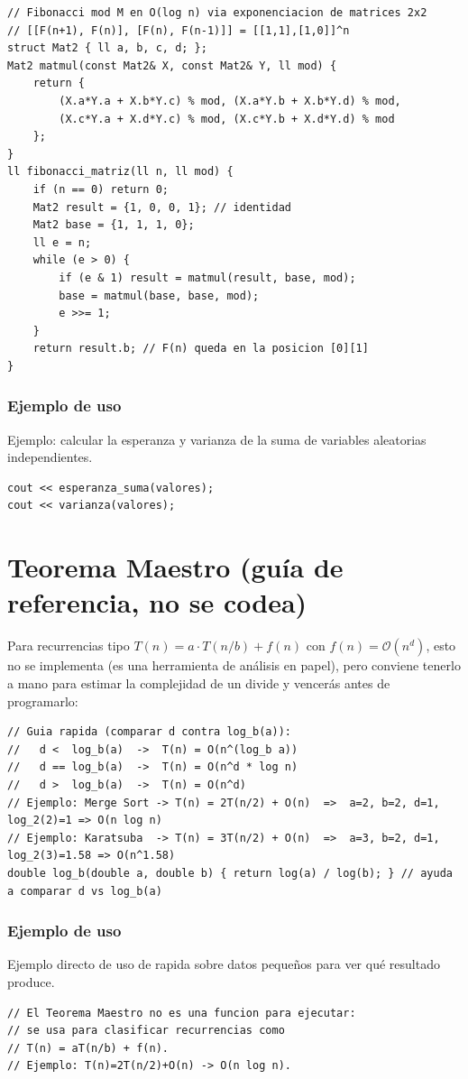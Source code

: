 \documentclass[10pt,twocolumn,letterpaper]{report}
\begin{document}
\begin{lstlisting}
// Fibonacci mod M en O(log n) via exponenciacion de matrices 2x2
// [[F(n+1), F(n)], [F(n), F(n-1)]] = [[1,1],[1,0]]^n
struct Mat2 { ll a, b, c, d; };
Mat2 matmul(const Mat2& X, const Mat2& Y, ll mod) {
    return {
        (X.a*Y.a + X.b*Y.c) % mod, (X.a*Y.b + X.b*Y.d) % mod,
        (X.c*Y.a + X.d*Y.c) % mod, (X.c*Y.b + X.d*Y.d) % mod
    };
}
ll fibonacci_matriz(ll n, ll mod) {
    if (n == 0) return 0;
    Mat2 result = {1, 0, 0, 1}; // identidad
    Mat2 base = {1, 1, 1, 0};
    ll e = n;
    while (e > 0) {
        if (e & 1) result = matmul(result, base, mod);
        base = matmul(base, base, mod);
        e >>= 1;
    }
    return result.b; // F(n) queda en la posicion [0][1]
}
\end{lstlisting}
\subsubsection*{Ejemplo de uso}
Ejemplo: calcular la esperanza y varianza de la suma de variables aleatorias independientes.
\begin{lstlisting}
cout << esperanza_suma(valores);
cout << varianza(valores);
\end{lstlisting}


\section{Teorema Maestro (guía de referencia, no se codea)}
Para recurrencias tipo $T(n) = a \cdot T(n/b) + f(n)$ con $f(n) = \mathcal{O}(n^d)$, esto no se implementa (es una herramienta de análisis en papel), pero conviene tenerlo a mano para estimar la complejidad de un divide y vencerás antes de programarlo:
\begin{lstlisting}
// Guia rapida (comparar d contra log_b(a)):
//   d <  log_b(a)  ->  T(n) = O(n^(log_b a))
//   d == log_b(a)  ->  T(n) = O(n^d * log n)
//   d >  log_b(a)  ->  T(n) = O(n^d)
// Ejemplo: Merge Sort -> T(n) = 2T(n/2) + O(n)  =>  a=2, b=2, d=1, log_2(2)=1 => O(n log n)
// Ejemplo: Karatsuba  -> T(n) = 3T(n/2) + O(n)  =>  a=3, b=2, d=1, log_2(3)=1.58 => O(n^1.58)
double log_b(double a, double b) { return log(a) / log(b); } // ayuda a comparar d vs log_b(a)
\end{lstlisting}
\subsubsection*{Ejemplo de uso}
Ejemplo directo de uso de rapida sobre datos pequeños para ver qué resultado produce.
\begin{lstlisting}
// El Teorema Maestro no es una funcion para ejecutar:
// se usa para clasificar recurrencias como
// T(n) = aT(n/b) + f(n).
// Ejemplo: T(n)=2T(n/2)+O(n) -> O(n log n).
\end{lstlisting}
\end{document}
